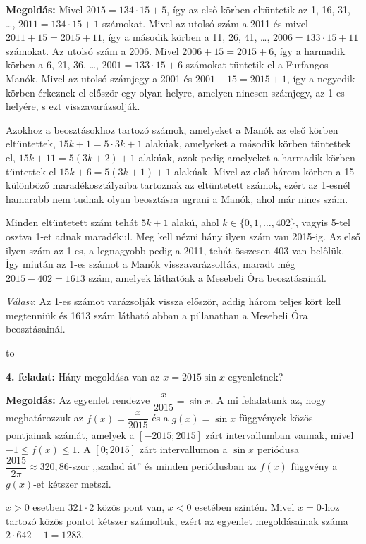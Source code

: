 \documentclass[a4paper,10pt]{article}
\newcommand{\vonal}{\hbox to \hsize{\hskip2truecm\hrulefill\hskip2truecm}}
\begin{document}
{\bf Megoldás: } Mivel $2015=134\cdot 15+5$, így az első körben eltüntetik az 1, 16, 31, \ldots, $2011=134\cdot 15+1$ számokat. Mivel az utolsó szám a 2011 és mivel $2011+15=2015+11$, így a második körben a 11, 26, 41, \ldots, $2006=133\cdot 15+11$  számokat. Az utolsó szám a 2006. Mivel $2006+15=2015+6$, így a harmadik körben a 6, 21, 36, \ldots, $2001=133\cdot 15+6$ számokat tüntetik el a Furfangos Manók. Mivel az utolsó számjegy a 2001 és $2001+15=2015+1$, így a negyedik körben érkeznek el először egy olyan helyre, amelyen nincsen számjegy, az 1-es helyére, s ezt visszavarázsolják. 

Azokhoz a beosztásokhoz tartozó számok, amelyeket a Manók az első körben eltüntettek, $15k+1=5\cdot 3k+1$ alakúak, amelyeket a második körben tüntettek el, $15k+11=5(3k+2)+1$ alakúak, azok pedig amelyeket a harmadik körben tüntettek el $15k+6=5(3k+1)+1$ alakúak. Mivel az első három körben a 15 különböző maradékosztályaiba tartoznak az eltüntetett számok, ezért az 1-esnél hamarabb nem tudnak olyan beosztásra ugrani a Manók, ahol már nincs szám.

Minden eltüntetett szám tehát $5k+1$ alakú, ahol $k\in\{0, 1, \ldots, 402\}$, vagyis 5-tel osztva 1-et adnak maradékul. Meg kell nézni hány ilyen szám van 2015-ig. Az első ilyen szám az 1-es, a legnagyobb pedig a 2011, tehát összesen 403 van belőlük. Így miután az 1-es számot a Manók visszavarázsolták, maradt még $2015-402=1613$ szám, amelyek láthatóak a Mesebeli Óra beosztásainál.

\textit{Válasz}: Az 1-es számot varázsolják vissza először, addig három teljes kört kell megtenniük és 1613 szám látható abban a pillanatban a Mesebeli Óra beosztásainál.


\vonal

{\bf 4. feladat: } Hány megoldása van az $x=2015\sin x$ egyenletnek?

{\bf Megoldás: } Az egyenlet rendezve $\dfrac{x}{2015}=\sin x$. A mi feladatunk az, hogy meghatározzuk az $f(x)=\dfrac{x}{2015}$ és a $g(x)=\sin x$ függvények közös pontjainak számát, amelyek a $[-2015; 2015]$ zárt intervallumban vannak, mivel $-1\le f(x) \le 1$.
A $[0; 2015]$ zárt intervallumon a $\sin x$ periódusa $\dfrac{2015}{2\pi}\approx 320{,}86$-szor ,,szalad át'' és minden periódusban az $f(x)$ függvény a $g(x)$-et kétszer metszi.

$x>0$ esetben $321\cdot 2$ közös pont van, $x<0$ esetében szintén. Mivel $x=0$-hoz tartozó közös pontot kétszer számoltuk, ezért az egyenlet megoldásainak száma $2\cdot 642-1=1283$.
\end{document}
